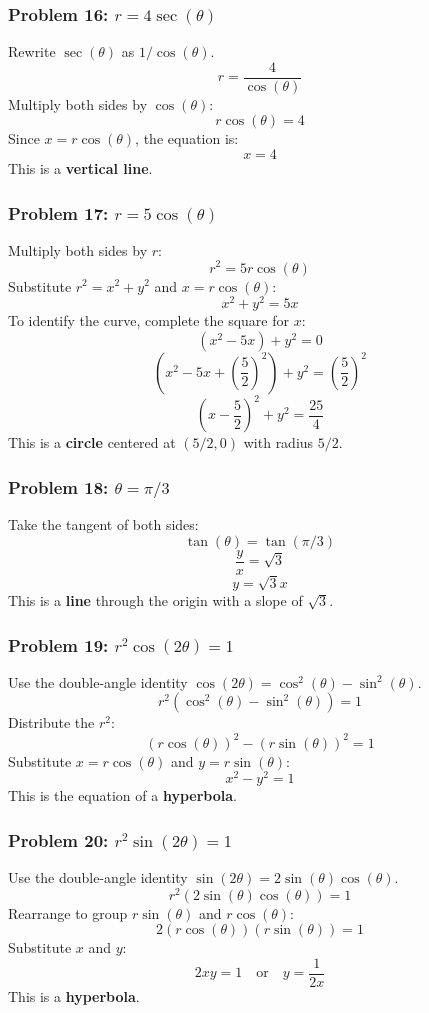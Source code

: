 \documentclass{article}
\begin{document}
\subsubsection*{Problem 16: \(r = 4 \sec(\theta)\)}
Rewrite \(\sec(\theta)\) as \(1/\cos(\theta)\).
\[ r = \frac{4}{\cos(\theta)} \]
Multiply both sides by \(\cos(\theta)\):
\[ r \cos(\theta) = 4 \]
Since \(x = r \cos(\theta)\), the equation is:
\[ x = 4 \]
This is a \textbf{vertical line}.

\subsubsection*{Problem 17: \(r = 5 \cos(\theta)\)}
Multiply both sides by \(r\):
\[ r^2 = 5r \cos(\theta) \]
Substitute \(r^2 = x^2 + y^2\) and \(x = r \cos(\theta)\):
\[ x^2 + y^2 = 5x \]
To identify the curve, complete the square for \(x\):
\[ (x^2 - 5x) + y^2 = 0 \]
\[ \left(x^2 - 5x + \left(\frac{5}{2}\right)^2\right) + y^2 = \left(\frac{5}{2}\right)^2 \]
\[ \left(x - \frac{5}{2}\right)^2 + y^2 = \frac{25}{4} \]
This is a \textbf{circle} centered at \((5/2, 0)\) with radius \(5/2\).

\subsubsection*{Problem 18: \(\theta = \pi/3\)}
Take the tangent of both sides:
\[ \tan(\theta) = \tan(\pi/3) \]
\[ \frac{y}{x} = \sqrt{3} \]
\[ y = \sqrt{3}x \]
This is a \textbf{line} through the origin with a slope of \(\sqrt{3}\).

\subsubsection*{Problem 19: \(r^2 \cos(2\theta) = 1\)}
Use the double-angle identity \(\cos(2\theta) = \cos^2(\theta) - \sin^2(\theta)\).
\[ r^2(\cos^2(\theta) - \sin^2(\theta)) = 1 \]
Distribute the \(r^2\):
\[ (r \cos(\theta))^2 - (r \sin(\theta))^2 = 1 \]
Substitute \(x = r \cos(\theta)\) and \(y = r \sin(\theta)\):
\[ x^2 - y^2 = 1 \]
This is the equation of a \textbf{hyperbola}.

\subsubsection*{Problem 20: \(r^2 \sin(2\theta) = 1\)}
Use the double-angle identity \(\sin(2\theta) = 2 \sin(\theta) \cos(\theta)\).
\[ r^2(2 \sin(\theta) \cos(\theta)) = 1 \]
Rearrange to group \(r \sin(\theta)\) and \(r \cos(\theta)\):
\[ 2 (r \cos(\theta))(r \sin(\theta)) = 1 \]
Substitute \(x\) and \(y\):
\[ 2xy = 1 \quad \text{or} \quad y = \frac{1}{2x} \]
This is a \textbf{hyperbola}.
\end{document}
